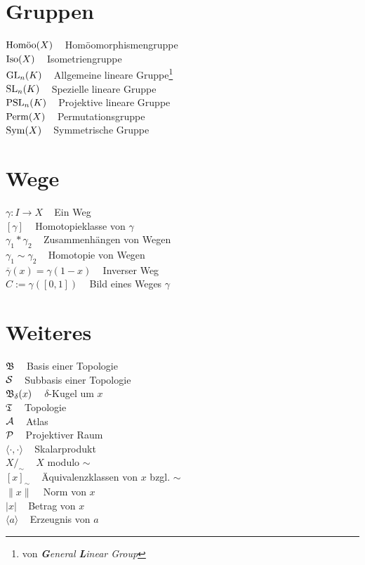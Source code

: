 \section*{Gruppen}
$\Homoo(X)\;\;\;$ Homöomorphismengruppe\\
$\Iso(X)\;\;\;$ Isometriengruppe\\
$\GL_n(K)\;\;\;$ Allgemeine lineare Gruppe\footnote{von \textit{\textbf{G}eneral \textbf{L}inear Group}}\\
$\SL_n(K)\;\;\;$ Spezielle lineare Gruppe\\
$\PSL_n(K)\;\;\;$ Projektive lineare Gruppe\\
$\Perm(X)\;\;\;$ Permutationsgruppe\\
$\Sym(X)\;\;\;$ Symmetrische Gruppe
\section*{Wege}
$\gamma: I \rightarrow X\;\;\;$ Ein Weg\\
$[\gamma]\;\;\;$ Homotopieklasse von $\gamma$\\
$\gamma_1 * \gamma_2\;\;\;$ Zusammenhängen von Wegen\\
$\gamma_1 \sim \gamma_2\;\;\;$ Homotopie von Wegen\\
$\overline{\gamma}(x) = \gamma(1-x)\;\;\;$ Inverser Weg\\
$C := \gamma([0,1])\;\;\;$ Bild eines Weges $\gamma$

\section*{Weiteres}
$\fB\;\;\;$ Basis einer Topologie\\
$\calS\;\;\;$ Subbasis einer Topologie\\
$\fB_\delta(x)\;\;\;$ $\delta$-Kugel um $x$\\
$\fT\;\;\;$ Topologie\\

$\atlas\;\;\;$ Atlas\\
$\praum\;\;\;$ Projektiver Raum\\
$\langle \cdot , \cdot \rangle\;\;\;$ Skalarprodukt\\
$X /_\sim\;\;\;$ $X$ modulo $\sim$\\
$[x]_\sim\;\;\;$ Äquivalenzklassen von $x$ bzgl. $\sim$\\
$\| x \|\;\;\;$ Norm von $x$\\
$| x |\;\;\;$ Betrag von $x$\\
$\langle a \rangle\;\;\;$ Erzeugnis von $a$\\

